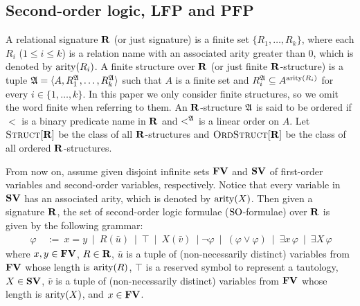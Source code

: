 

\subsection{Second-order logic, LFP and PFP}
A relational signature $\mathbf{R}$ (or just signature) is a finite set $\{R_1, \ldots, R_k\}$, where each $R_i$ ($1 \leq i \leq k$) is a relation name with an associated arity greater than 0, which is denoted by ${\rm arity}(R_i)$. A finite structure over $\mathbf{R}$ (or just finite $\mathbf{R}$-structure) is a tuple $\mathfrak{A} = \langle A, R_1^{\mathfrak{A}}, \ldots, R_k^{\mathfrak{A}} \rangle$ such that $A$ is a finite set and $R_i^{\mathfrak{A}} \subseteq A^{{\rm arity}(R_i)}$ for every $i \in \{1, \ldots, k\}$. In this paper we only consider finite structures, so we omit the word finite when referring to them. An $\mathbf{R}$-structure $\mathfrak{A}$ is said to be ordered if $<$ is a binary predicate name in $\mathbf{R}$ and $<^{\mathfrak{A}}$ is a linear order on $A$. Let $\text{\sc Struct}[\mathbf{R}]$ be the class of all $\mathbf{R}$-structures and $\text{\sc OrdStruct}[\mathbf{R}]$ be the class of all ordered $\mathbf{R}$-structures. 

From now on, assume given disjoint infinite sets $\mathbf{FV}$ and $\mathbf{SV}$ of first-order variables and second-order variables, respectively. Notice that every variable in $\mathbf{SV}$ has an associated arity, which is denoted by ${\rm arity}(X)$. Then given a  signature $\mathbf{R}$, the set of second-order logic formulae (${\rm SO}$-formulae) over $\mathbf{R}$ is given by the following grammar:
\begin{align*}\ 
	\varphi \ &:= \ x = y \ \mid \ R(\bar u) \ \mid \ \top  \ \mid\  
	X(\bar v)  \ \mid
	\neg \varphi \ \mid\ 
	(\varphi \vee \varphi) \ \mid\ 
	\exists x \, \varphi \ \mid\ 
	\exists X \, \varphi
 \end{align*}
where $x,y \in \mathbf{FV}$, $R \in \mathbf{R}$, $\bar u$ is a tuple of (non-necessarily distinct) variables from $\mathbf{FV}$ whose length is ${\rm arity}(R)$, $\top$ is a reserved symbol to represent a tautology, $X \in \mathbf{SV}$, $\bar v$ is a tuple of (non-necessarily distinct) variables from $\mathbf{FV}$ whose length is ${\rm arity}(X)$, and $x \in \mathbf{FV}$. 



